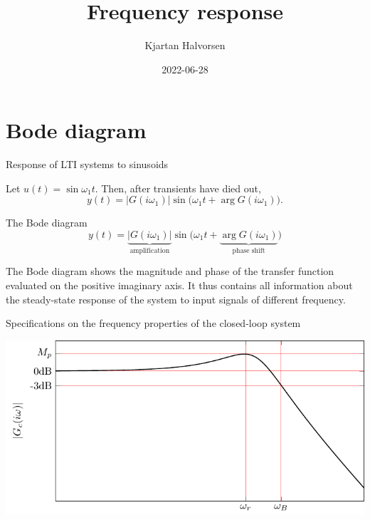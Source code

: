 \documentclass[presentation,aspectratio=169]{beamer}
\author{Kjartan Halvorsen}
\date{2022-06-28}
\title{Frequency response}
\begin{document}
\maketitle

\section{Bode diagram}
\label{sec:orgd44b59e}

\begin{frame}[label={sec:org5a18791}]{Response of LTI systems to sinusoids}
\begin{center}
\end{center}

Let \(u(t) = \sin\omega_1 t\). Then, after transients have died out,
\[ y(t) = |G(i\omega_1)| \sin \big( \omega_1 t + \arg G(i\omega_1)\big). \]
\end{frame}


\begin{frame}[label={sec:orgbb2bec3}]{The Bode diagram}
\[ y(t) = \underbrace{|G(i\omega_1)|}_{\text{amplification}} \sin \big( \omega_1 t + \underbrace{\arg G(i\omega_1)}_{\text{phase shift}} \big) \]

The Bode diagram shows the magnitude and phase of the transfer function evaluated on the positive imaginary axis. It thus contains all information about the steady-state response of the system to input signals of different frequency.
\end{frame}


\begin{frame}[label={sec:orgb469bab}]{Specifications on the frequency properties of the closed-loop system}
\begin{center}
\includegraphics[width=0.899\linewidth]{../../figures/spec-bode-closed-loop-new}
\end{center}
\end{frame}
\end{document}
